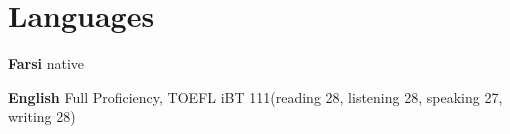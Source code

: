 
\section{Languages}
\begin{compactitem} 
	\item \textbf{Farsi} native 
	\item \textbf{English} Full Proficiency, TOEFL iBT 111(reading 28, listening 28, speaking 27, writing 28)
\end{compactitem}